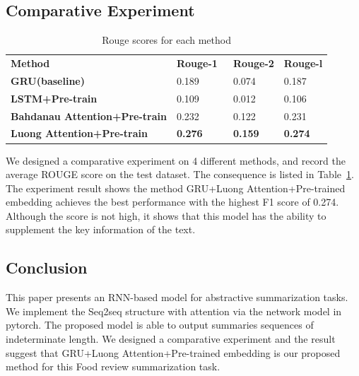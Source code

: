 \documentclass[conference]{IEEEtran}
\begin{document}
\subsection{Comparative Experiment}
\begin{table}
\centering
\caption{\label{tab:Results}Rouge scores for each method}
\begin{tabular}{llll} 
\toprule
\textbf{Method}                              & \textbf{Rouge-1~} & \textbf{Rouge-2} & \textbf{Rouge-l}  \\
\textbf{GRU(baseline)}                       & 0.189             & 0.074            & 0.187             \\
\textbf{LSTM+Pre-train}          & 0.109             & 0.012            & 0.106             \\
\textbf{Bahdanau Attention+Pre-train} & 0.232             & 0.122            & 0.231             \\
\textbf{Luong Attention+Pre-train}    & \textbf{0.276}    & \textbf{0.159}   & \textbf{0.274}    \\
\bottomrule
\end{tabular}
\end{table}
We designed a comparative experiment on 4 different methods, and record the average ROUGE score on the test dataset. The consequence is listed in Table~\ref{tab:Results}. The experiment result shows the method GRU+Luong Attention+Pre-trained embedding achieves the best performance with the highest F1 score of 0.274. Although the score is not high, it shows that this model has the ability to supplement the key information of the text. 
\subsection{Conclusion}
This paper presents an RNN-based model for abstractive summarization tasks. We implement the Seq2seq structure with attention via the network model in pytorch. The proposed model is able to output summaries sequences of indeterminate length. We designed a comparative experiment and the result suggest that GRU+Luong Attention+Pre-trained embedding is our proposed method for this Food review summarization task. 



\end{document}
